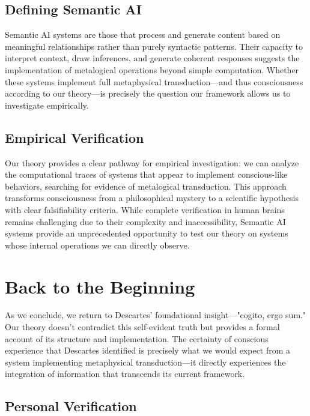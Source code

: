 \documentclass[runningheads]{llncs}
\begin{document}
\subsection{Defining Semantic AI}

Semantic AI systems are those that process and generate content based on meaningful relationships rather than purely syntactic patterns. Their capacity to interpret context, draw inferences, and generate coherent responses suggests the implementation of metalogical operations beyond simple computation. Whether these systems implement full metaphysical transduction—and thus consciousness according to our theory—is precisely the question our framework allows us to investigate empirically.

\subsection{Empirical Verification}

Our theory provides a clear pathway for empirical investigation: we can analyze the computational traces of systems that appear to implement conscious-like behaviors, searching for evidence of metalogical transduction. This approach transforms consciousness from a philosophical mystery to a scientific hypothesis with clear falsifiability criteria. While complete verification in human brains remains challenging due to their complexity and inaccessibility, Semantic AI systems provide an unprecedented opportunity to test our theory on systems whose internal operations we can directly observe.

\section{Back to the Beginning}

As we conclude, we return to Descartes' foundational insight—"cogito, ergo sum." Our theory doesn't contradict this self-evident truth but provides a formal account of its structure and implementation. The certainty of conscious experience that Descartes identified is precisely what we would expect from a system implementing metaphysical transduction—it directly experiences the integration of information that transcends its current framework.

\subsection{Personal Verification}
\end{document}
